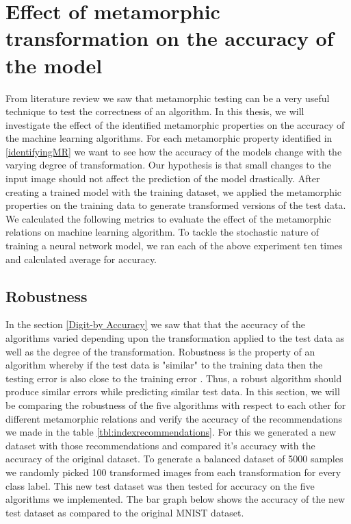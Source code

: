 \section{Effect of metamorphic transformation on the accuracy of the model}
From literature review we saw that metamorphic testing can be a very useful technique to test the correctness of an algorithm. In this thesis, we will investigate the effect of the identified metamorphic properties on the accuracy of the machine learning algorithms. For each metamorphic property identified in \ref{identifyingMR} we want to see how the accuracy of the models change with the varying degree of transformation. Our hypothesis is that small changes to the input image should not affect the prediction of the model drastically. After creating a trained model with the training dataset, we applied the metamorphic properties on the training data to generate transformed versions of the test data. We calculated the following metrics to evaluate the effect of the metamorphic relations on machine learning algorithm. To tackle the stochastic nature of training a neural network model, we ran each of the above experiment ten times and calculated average for accuracy.



\clearpage
\subsection{Robustness}

In the section \ref{Digit-by Accuracy} we saw that that the accuracy of the algorithms varied depending upon the transformation applied to the test data as well as the degree of the transformation. Robustness is the property of an algorithm whereby if the test data is "similar" to the training data then the testing error is also close to the training error \cite{Xu2012}. Thus, a robust algorithm should produce similar errors while predicting similar test data. In this section, we will be comparing the robustness of the five algorithms with respect to each other for different metamorphic relations and verify the accuracy of the recommendations we made in the table \ref{tbl:indexrecommendations}. For this we generated a new dataset with those recommendations and compared it's accuracy with the accuracy of the original dataset. To generate a balanced dataset of 5000 samples we randomly picked 100 transformed images from each transformation for every class label. This new test dataset was then tested for accuracy on the five algorithms we implemented. The bar graph below shows the accuracy of the new test dataset as compared to the original MNIST dataset.

